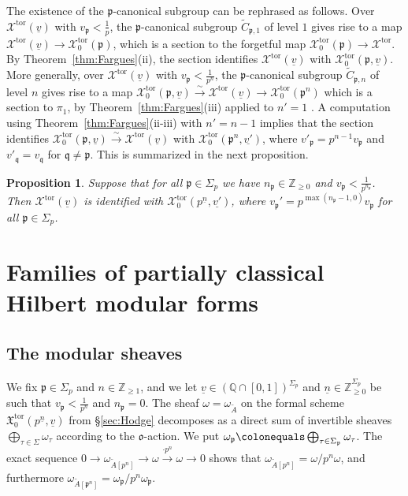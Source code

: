 \documentclass[11pt]{amsart}
\theoremstyle{definition} %
\theoremstyle{plain} %
\newtheorem{proposition}[definition]{Proposition}
\theoremstyle{remark} %
\newcommand{\QQ}{{\mathbb Q}}
\newcommand{\ZZ}{{\mathbb Z}}
\newcommand{\cX}{{\mathcal X}}
\newcommand{\frakX}{\mathfrak X}
\newcommand{\frako}{\mathfrak o}
\newcommand{\frakp}{\mathfrak p}
\newcommand{\frakq}{\mathfrak q}
\newcommand{\defeq}{\colonequals} %
\newcommand{\tor}{\mathrm{tor}} %
\begin{document}
The existence of the $\frakp$-canonical subgroup can be rephrased as follows.
Over $\cX^\tor(\underline{v})$ with $v_\frakp<\frac1{p}$, the $\frakp$-canonical subgroup $\widetilde{C}_{\frakp,1}$ of  level $1$ gives rise to a map $\cX^\tor(\underline{v}) \rightarrow \cX_0^\tor(\frakp)$, which is a section to the forgetful map $\cX_0^\tor(\frakp) \rightarrow \cX^\tor$.
By Theorem~\ref{thm:Fargues}(ii), the section identifies $\cX^\tor(\underline{v})$ with $\cX_0^\tor(\frakp,\underline{v})$.
More generally, over $\cX^\tor(\underline{v})$ with $v_\frakp<\frac1{p^n}$, the $\frakp$-canonical subgroup $\widetilde{C}_{\frakp,n}$ of level $n$ gives rise to a map $\cX_0^\tor(\frakp,\underline{v})\xrightarrow{\sim}\cX^\tor(\underline{v}) \rightarrow \cX_0^\tor(\frakp^n)$ which is a section to $\pi_1$, by Theorem~\ref{thm:Fargues}(iii) applied to $n'=1$ .
A computation using Theorem~\ref{thm:Fargues}(ii-iii) with $n'=n-1$ implies that the section identifies $\cX_0^\tor(\frakp,\underline{v})\xrightarrow{\sim}\cX^\tor(\underline{v})$ with $\cX_0^\tor(\frakp^n,\underline{v'})$, where $v'_\frakp = p^{n-1}v_\frakp$ and $v'_\frakq = v_\frakq$ for $\frakq\neq\frakp$.
This is  summarized in the next proposition. 
\begin{proposition} \label{prop:curve_isom}
 Suppose that for all $\frakp\in \Sigma_p$ we have $n_\frakp \in\ZZ_{\geqslant 0}$ and  $v_\frakp < \frac1{p^{n_\frakp}}$.
Then $\cX^\tor(\underline{v})$ is identified with $\cX_0^\tor(p^{\underline{n}},\underline{v'})$, 
where $v_\frakp' = p^{\max(n_\frakp-1,0)}v_\frakp$ for all $\frakp\in \Sigma_p$.
\end{proposition}




\section{Families of partially classical Hilbert modular forms}

\subsection{The modular sheaves}

We fix   $\frakp\in\Sigma_p$ and $n\in\ZZ_{\geqslant 1}$, and we let   $\underline{v}\in (\QQ\cap [0,1])^{\Sigma_p}$ and
$\underline{n}  \in \ZZ_{\geqslant 0}^{\Sigma_p}$  be such that $v_\frakp<\frac1{p^{n}}$ and $n_\frakp=0$. 
 The sheaf $\omega = \omega_{\widetilde{A}}$ on the 
 formal scheme $\frakX_0^\tor(p^{\underline{n}},\underline{v})$ from \S\ref{sec:Hodge} 
 decomposes as a direct sum of invertible sheaves  $ \bigoplus_{\tau\in\Sigma} \omega_{\tau}$ 
according to the $\frako$-action.  We put $\omega_\frakp \defeq \bigoplus_{\tau\in\Sigma_\frakp} \omega_\tau$.
The exact sequence $0 \rightarrow \omega_{\widetilde{A}[p^n]} \rightarrow \omega \xrightarrow{\cdot p^n} \omega\rightarrow 0$ shows that $\omega_{\widetilde{A}[p^n]} = \omega/p^n\omega$,  and furthermore $\omega_{\widetilde{A}[\frakp^n]} = \omega_{\frakp}/p^n\omega_{\frakp}$. 
\end{document}
